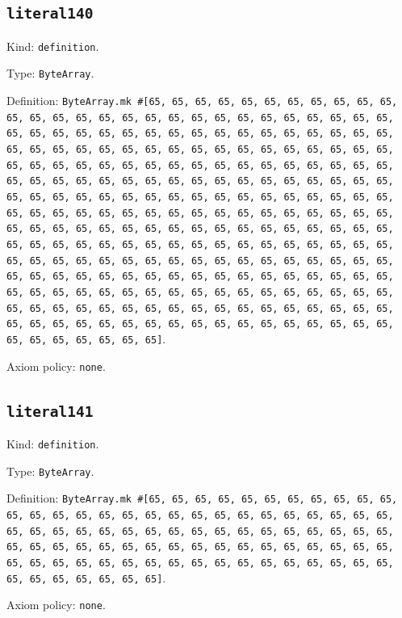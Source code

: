 \documentclass[11pt]{article}
\begin{document}
\subsection*{\texttt{literal140}}
\noindent Kind: \texttt{definition}.\par
\noindent Type: \texttt{ByteArray}.\par
\noindent Definition: \texttt{ByteArray.mk \#[65, 65, 65, 65, 65, 65, 65, 65, 65, 65, 65, 65, 65, 65, 65, 65, 65, 65, 65, 65, 65, 65, 65, 65, 65, 65, 65, 65, 65, 65, 65, 65, 65, 65, 65, 65, 65, 65, 65, 65, 65, 65, 65, 65, 65, 65, 65, 65, 65, 65, 65, 65, 65, 65, 65, 65, 65, 65, 65, 65, 65, 65, 65, 65, 65, 65, 65, 65, 65, 65, 65, 65, 65, 65, 65, 65, 65, 65, 65, 65, 65, 65, 65, 65, 65, 65, 65, 65, 65, 65, 65, 65, 65, 65, 65, 65, 65, 65, 65, 65, 65, 65, 65, 65, 65, 65, 65, 65, 65, 65, 65, 65, 65, 65, 65, 65, 65, 65, 65, 65, 65, 65, 65, 65, 65, 65, 65, 65, 65, 65, 65, 65, 65, 65, 65, 65, 65, 65, 65, 65, 65, 65, 65, 65, 65, 65, 65, 65, 65, 65, 65, 65, 65, 65, 65, 65, 65, 65, 65, 65, 65, 65, 65, 65, 65, 65, 65, 65, 65, 65, 65, 65, 65, 65, 65, 65, 65, 65, 65, 65, 65, 65, 65, 65, 65, 65, 65, 65, 65, 65, 65, 65, 65, 65, 65, 65, 65, 65, 65, 65, 65, 65, 65, 65, 65, 65, 65, 65, 65, 65, 65, 65, 65, 65, 65, 65, 65, 65, 65, 65, 65, 65, 65, 65, 65, 65, 65, 65, 65, 65, 65, 65, 65, 65, 65, 65, 65, 65, 65, 65, 65, 65, 65, 65, 65, 65, 65, 65, 65, 65, 65, 65, 65, 65, 65, 65]}.\par
\noindent Axiom policy: \texttt{none}.\par
\subsection*{\texttt{literal141}}
\noindent Kind: \texttt{definition}.\par
\noindent Type: \texttt{ByteArray}.\par
\noindent Definition: \texttt{ByteArray.mk \#[65, 65, 65, 65, 65, 65, 65, 65, 65, 65, 65, 65, 65, 65, 65, 65, 65, 65, 65, 65, 65, 65, 65, 65, 65, 65, 65, 65, 65, 65, 65, 65, 65, 65, 65, 65, 65, 65, 65, 65, 65, 65, 65, 65, 65, 65, 65, 65, 65, 65, 65, 65, 65, 65, 65, 65, 65, 65, 65, 65, 65, 65, 65, 65, 65, 65, 65, 65, 65, 65, 65, 65, 65, 65, 65, 65, 65, 65, 65, 65, 65, 65, 65, 65, 65, 65]}.\par
\noindent Axiom policy: \texttt{none}.\par
\end{document}
